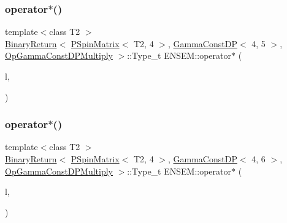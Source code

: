 \subsubsection{\texorpdfstring{operator$\ast$()}{operator*()}\hspace{0.1cm}{\footnotesize\ttfamily [54/64]}}
{\footnotesize\ttfamily template$<$class T2 $>$ \\
\mbox{\hyperlink{structENSEM_1_1BinaryReturn}{Binary\+Return}}$<$ \mbox{\hyperlink{classENSEM_1_1PSpinMatrix}{P\+Spin\+Matrix}}$<$ T2, 4 $>$, \mbox{\hyperlink{classENSEM_1_1GammaConstDP}{Gamma\+Const\+DP}}$<$ 4, 5 $>$, \mbox{\hyperlink{structENSEM_1_1OpGammaConstDPMultiply}{Op\+Gamma\+Const\+D\+P\+Multiply}} $>$\+::Type\+\_\+t E\+N\+S\+E\+M\+::operator$\ast$ (\begin{DoxyParamCaption}\item[{const \mbox{\hyperlink{classENSEM_1_1PSpinMatrix}{P\+Spin\+Matrix}}$<$ T2, 4 $>$ \&}]{l,  }\item[{const \mbox{\hyperlink{classENSEM_1_1GammaConstDP}{Gamma\+Const\+DP}}$<$ 4, 5 $>$ \&}]{ }\end{DoxyParamCaption})\hspace{0.3cm}{\ttfamily [inline]}}

\mbox{\label{group__primspinmatrix_gac2a770f56cbf8ef3fd61c80d05ee306e}} 
\subsubsection{\texorpdfstring{operator$\ast$()}{operator*()}\hspace{0.1cm}{\footnotesize\ttfamily [55/64]}}
{\footnotesize\ttfamily template$<$class T2 $>$ \\
\mbox{\hyperlink{structENSEM_1_1BinaryReturn}{Binary\+Return}}$<$ \mbox{\hyperlink{classENSEM_1_1PSpinMatrix}{P\+Spin\+Matrix}}$<$ T2, 4 $>$, \mbox{\hyperlink{classENSEM_1_1GammaConstDP}{Gamma\+Const\+DP}}$<$ 4, 6 $>$, \mbox{\hyperlink{structENSEM_1_1OpGammaConstDPMultiply}{Op\+Gamma\+Const\+D\+P\+Multiply}} $>$\+::Type\+\_\+t E\+N\+S\+E\+M\+::operator$\ast$ (\begin{DoxyParamCaption}\item[{const \mbox{\hyperlink{classENSEM_1_1PSpinMatrix}{P\+Spin\+Matrix}}$<$ T2, 4 $>$ \&}]{l,  }\item[{const \mbox{\hyperlink{classENSEM_1_1GammaConstDP}{Gamma\+Const\+DP}}$<$ 4, 6 $>$ \&}]{ }\end{DoxyParamCaption})\hspace{0.3cm}{\ttfamily [inline]}}

